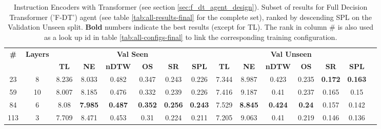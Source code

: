 \begin{table}
\centering
\caption{\label{tab:instruction_encoding_full}Instruction Encoders with Transformer (see section \ref{sec:f_dt_agent_design}). Subset of results for Full Decision Transformer ('F-DT') agent (see table \ref{tab:all-results-final} for the complete set), ranked by descending SPL on the Validation Unseen split. \textbf{Bold} numbers indicate the best results (except for TL). The rank in column \# is also used as a look up id in table \ref{tab:all-configs-final} to link the corresponding training configuration.}
\begin{tabular}{@{\hskip3pt}c@{\hskip3pt}c@{\hskip3pt}c@{\hskip3pt}c@{\hskip3pt}c@{\hskip3pt}c@{\hskip3pt}c@{\hskip3pt}c@{\hskip3pt}c@{\hskip3pt}c@{\hskip3pt}c@{\hskip3pt}c@{\hskip3pt}c@{\hskip3pt}c@{\hskip3pt}c}
\toprule
                                  \textbf{\#} & \textbf{Layers} & \multicolumn{6}{c}{\textbf{Val Seen}} & \multicolumn{6}{c}{\textbf{Val Unseen}} \\
\cmidrule(l){3-8}\cmidrule(l){9-14}\textbf{~} &      \textbf{~} &       \textbf{TL} &     \textbf{NE} &   \textbf{nDTW} &     \textbf{OS} &     \textbf{SR} &    \textbf{SPL} &         \textbf{TL} &     \textbf{NE} &   \textbf{nDTW} &    \textbf{OS} &     \textbf{SR} &    \textbf{SPL} \\
\midrule
                                           23 &               8 &             8.236 &           8.033 &           0.482 &           0.347 &           0.243 &           0.226 &               7.344 &           8.987 &           0.423 &          0.235 &  \textbf{0.172} &  \textbf{0.163} \\
                                           59 &              10 &             8.007 &           8.185 &           0.476 &           0.332 &           0.239 &           0.226 &               7.416 &           9.187 &            0.41 &          0.237 &           0.165 &            0.15 \\
                                           84 &               6 &              8.08 &  \textbf{7.985} &  \textbf{0.487} &  \textbf{0.352} &  \textbf{0.256} &  \textbf{0.243} &               7.529 &  \textbf{8.845} &  \textbf{0.424} &  \textbf{0.24} &           0.157 &           0.142 \\
                                          113 &               3 &             7.709 &           8.471 &           0.453 &            0.31 &           0.224 &           0.211 &               7.205 &           9.063 &            0.41 &          0.219 &           0.146 &           0.136 \\
\bottomrule
\end{tabular}
\end{table}
